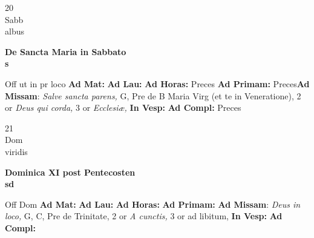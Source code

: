 \documentclass[10pt, openany]{book}
\begin{document}
    \begin{center}
        \begin{minipage}{3.5in}
            \vspace{2em}
            \begin{minipage}{0.5in}
                {\Huge 20} \\
                {\normalsize Sabb} \\
                {\normalsize albus}
            \end{minipage}
            \begin{minipage}{3.0in}
                \textbf{ \large De Sancta Maria in Sabbato \\
                \textnormal{\normalsize s}} \\ 
            \end{minipage}
            \begin{justify}Off ut in pr loco
                \textbf{Ad Mat: }
                \textbf{Ad Lau: }
                \textbf{Ad Horas: }Preces
                \textbf{Ad Primam: }Preces\textbf{Ad Missam}: \textit{Salve sancta parens,} G, Pre de B Maria Virg (et te in Veneratione), 2 or \textit{Deus qui corda,} 3 or \textit{Ecclesiæ,}  
                \textbf{In Vesp: }
                \textbf{Ad Compl: }Preces
            \end{justify}
        \end{minipage}
    \end{center}

    \begin{center}
        \begin{minipage}{3.5in}
            \vspace{2em}
            \begin{minipage}{0.5in}
                {\Huge 21} \\
                {\normalsize Dom} \\
                {\normalsize viridis}
            \end{minipage}
            \begin{minipage}{3.0in}
                \textbf{ \large Dominica XI post Pentecosten \\
                \textnormal{\normalsize sd}} \\ 
            \end{minipage}
            \begin{justify}Off Dom
                \textbf{Ad Mat: }
                \textbf{Ad Lau: }
                \textbf{Ad Horas: }
                \textbf{Ad Primam: }\textbf{Ad Missam}: \textit{Deus in loco,} G, C, Pre de Trinitate, 2 or \textit{A cunctis,} 3 or ad libitum,  
                \textbf{In Vesp: }
                \textbf{Ad Compl: }
            \end{justify}
        \end{minipage}
    \end{center}
\end{document}
